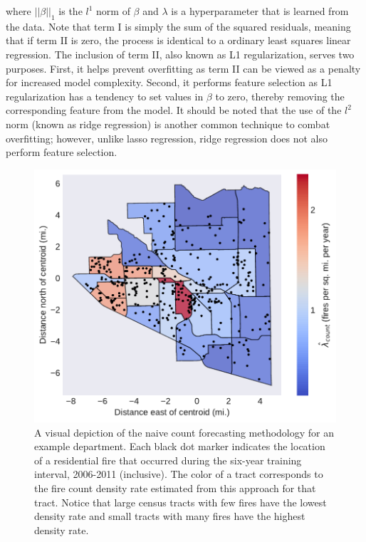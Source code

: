 \documentclass{article}
\begin{document}
\noindent where $||\beta||_1$ is the $l^1$ norm of $\beta$ and $\lambda$ is a hyperparameter that is learned from the data. Note that term I is simply the sum of the squared residuals, meaning that if term II is zero, the process is identical to a ordinary least squares linear regression. The inclusion of term II, also known as L1 regularization, serves two purposes. First, it helps prevent overfitting as term II can be viewed as a penalty for increased model complexity. Second, it performs feature selection as L1 regularization has a tendency to set values in $\beta$ to zero, thereby removing the corresponding feature from the model. It should be noted that the use of the $l^2$ norm (known as ridge regression) is another common technique to combat overfitting; however, unlike lasso regression, ridge regression does not also perform feature selection. 


\begin{figure}[htb] \centering
\includegraphics[width=.75\textwidth]{./figures/spatial_histogram.pdf}
\caption{A visual depiction of the naive count forecasting methodology for an example department. Each black dot marker indicates the location of a residential fire that occurred during the six-year training interval, 2006-2011 (inclusive). The color of a tract corresponds to the fire count density rate estimated from this approach for that tract. Notice that large census tracts with few fires have the lowest density rate and small tracts with many fires have the highest density rate.}
\label{fig:spatial_histogram}
\end{figure}




\clearpage


\end{document}
